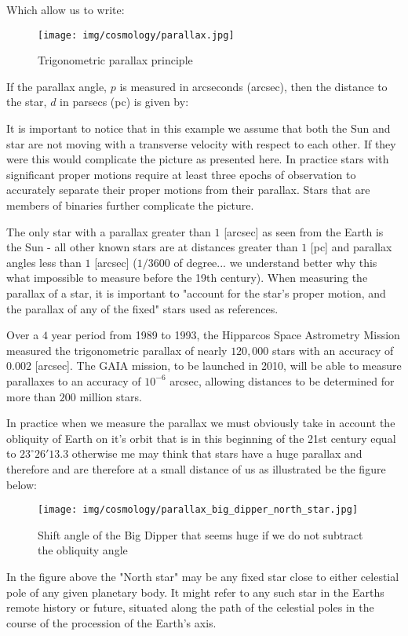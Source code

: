 	Which allow us to write:
	
	\begin{figure}[H]
		\begin{center}
		\texttt{[image: img/cosmology/parallax.jpg]}
		\caption{Trigonometric parallax principle}
		\end{center}
	\end{figure}
	If the parallax angle, $p$ is measured in arcseconds (arcsec), then the distance to the star, $d$ in parsecs (pc) is given by:
	
	It is important to notice that in this example we assume that both the Sun and star are not moving with a transverse velocity with respect to each other. If they were this would complicate the picture as presented here. In practice stars with significant proper motions require at least three epochs of observation to accurately separate their proper motions from their parallax. Stars that are members of binaries further complicate the picture.

	The only star with a parallax greater than $1$ [arcsec] as seen from the Earth is the Sun - all other known stars are at distances greater than $1$ [pc] and parallax angles less than $1$ [arcsec] ($1/3600$ of degree... we understand better why this what impossible to measure before the 19th century). When measuring the parallax of a star, it is important to "account for the star’s proper motion, and the parallax of any of the fixed" stars used as references.

	Over a $4$ year period from 1989 to 1993, the Hipparcos Space Astrometry Mission measured the trigonometric parallax of nearly $120,000$ stars with an accuracy of $0.002$ [arcsec]. The GAIA mission, to be launched in 2010, will be able to measure parallaxes to an accuracy of $10^{-6}$ arcsec, allowing distances to be determined for more than $200$ million stars.
	
	In practice when we measure the parallax we must obviously take in account the obliquity of Earth on it's orbit that is in this beginning of the 21st century equal to $23^\circ 26'13.3$ otherwise me may think that stars have a huge parallax and therefore and are therefore at a small distance of us as illustrated be the figure below:
	\begin{figure}[H]
		\centering
		\texttt{[image: img/cosmology/parallax\_big\_dipper\_north\_star.jpg]}
		\caption[]{Shift angle of the Big Dipper that seems huge if we do not subtract the obliquity angle}
	\end{figure}
	In the figure above the "North star" may be any fixed star close to either celestial pole of any given planetary body. It might refer to any such star in the Earths remote history or future, situated along the path of the celestial poles in the course of the procession of the Earth's axis.
	
